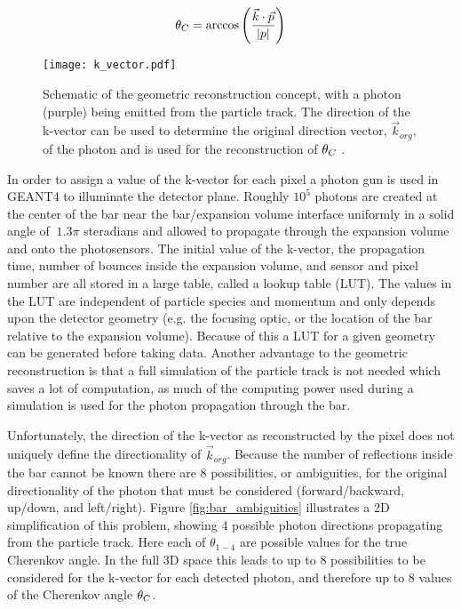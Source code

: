 \begin{equation}
	\theta_{C} = \arccos\left(\frac{\vec{k}\cdot\vec{p}}{|p|}\right)
\end{equation}

\begin{figure}[!htb]
	\centering
	\texttt{[image: k\_vector.pdf]}
	\caption[Schematic of the geometric reconstruction concept, with a photon (purple) being emitted from the particle track.]{Schematic of the geometric reconstruction concept, with a photon (purple) being emitted from the particle track. The direction of the k-vector can be used to determine the original direction vector, $\vec{k}_{org}$, of the photon and is used for the reconstruction of $\theta_{C}$ \cite{GregThesis}.}
	\label{fig:k_vector}
\end{figure}

In order to assign a value of the k-vector for each pixel a photon gun is used in GEANT4 to illuminate the detector plane. Roughly $10^5$ photons are created at the center of the bar near the bar/expansion volume interface uniformly in a solid angle of $~1.3\pi$ steradians and allowed to propagate through the expansion volume and onto the photosensors. The initial value of the k-vector, the propagation time,  number of bounces inside the expansion volume, and sensor and pixel number are all stored in a large table, called a lookup table (LUT). The values in the LUT are independent of particle species and momentum and only depends upon the detector geometry (e.g. the focusing optic, or the location of the bar relative to the expansion volume). Because of this a LUT for a given geometry can be generated before taking data. Another advantage to the geometric reconstruction is that a full simulation of the particle track is not needed which saves a lot of computation, as much of the computing power used during a simulation is used for the photon propagation through the bar.

Unfortunately, the direction of the k-vector as reconstructed by the pixel does not uniquely define the directionality of $\vec{k}_{org}$. Because the number of reflections inside the bar cannot be known there are 8 possibilities, or ambiguities, for the original directionality of the photon that must be considered (forward/backward, up/down, and left/right). Figure \ref{fig:bar_ambiguities} illustrates a 2D simplification of this problem, showing 4 possible photon directions propagating from the particle track. Here each of $\theta_{1-4}$ are possible values for the true Cherenkov angle. In the full 3D space this leads to up to 8 possibilities to be considered for the k-vector for each detected photon, and therefore up to 8 values of the Cherenkov angle $\theta_{C}$.

